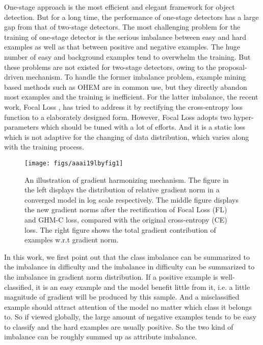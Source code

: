 \documentclass[letterpaper]{article} \usepackage{aaai19}  \usepackage{times}  \usepackage{helvet}  \usepackage{courier}  \usepackage{url}  \usepackage{graphicx}  \usepackage{amsmath,amssymb}
\begin{document}
One-stage approach is the most efficient and elegant framework for object detection. But for a long time, the performance of one-stage detectors has a large gap from that of two-stage detectors. The most challenging problem for the training of one-stage detector is the serious imbalance between easy and hard examples as well as that between positive and negative examples. The huge number of easy and background examples tend to overwhelm the training. But these problems are not existed for two-stage detectors, owing to the proposal-driven mechanism. To handle the former imbalance problem, example mining based methods such as OHEM \cite{ohem} are in common use, but they directly abandon most examples and the training is inefficient. For the latter imbalance, the recent work, Focal Loss \cite{focal}, has tried to address it by rectifying the cross-entropy loss function to a elaborately designed form. However, Focal Loss adopts two hyper-parameters which should be tuned with a lot of efforts. And it is a static loss which is not adaptive for the changing of data distribution, which varies along with the training process.

\begin{figure}[t]
\centering
\texttt{[image: figs/aaai19lbyfig1]}
\caption{An illustration of gradient harmonizing mechanism. The figure in the left displays the distribution of relative gradient norm in a converged model in log scale respectively. The middle figure displays the new gradient norms after the rectification of Focal Loss (FL) and GHM-C loss, compared with the original cross-entropy (CE) loss. The right figure shows the total gradient contribution of examples w.r.t gradient norm.}
\label{fig:method}
\end{figure}

In this work, we first point out that the class imbalance can be summarized to the imbalance in difficulty and the imbalance in difficulty can be summarized to the imbalance in gradient norm distribution. If a positive example is well-classified, it is an easy example and the model benefit little from it, i.e. a little magnitude of gradient will be produced by this sample. And a misclassified example should attract attention of the model no matter which class it belongs to. So if viewed globally, the large amount of negative examples tends to be easy to classify and the hard examples are usually positive. So the two kind of imbalance can be roughly summed up as attribute imbalance.
\end{document}
